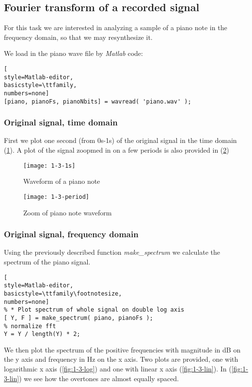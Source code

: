 \subsection{ Fourier transform of a recorded signal }
For this task we are interested in analyzing a sample of a piano note in the
frequency domain, so that we may resynthesize it.

We load in the piano wave file by \emph{Matlab} code:
\begin{lstlisting}[
style=Matlab-editor,
basicstyle=\ttfamily,
numbers=none]
[piano, pianoFs, pianoNbits] = wavread( 'piano.wav' );
\end{lstlisting}


\subsubsection{ Original signal, time domain }
First we plot one second (from 0s-1s) of the original signal in the time domain
(\ref{fig:1-3-1s}).
A plot of the signal zoopmed in on a few periods is also provided in
(\ref{fig:1-3-period})

\begin{figure}
	\center
	\texttt{[image: 1-3-1s]}
	\caption{ Waveform of a piano note }
	\label{fig:1-3-1s}
\end{figure}

\begin{figure}
	\center
	\texttt{[image: 1-3-period]}
	\caption{ Zoom of piano note waveform }
	\label{fig:1-3-period}
\end{figure}

\subsubsection{ Original signal, frequency domain }
Using the previously described function \emph{make\_spectrum} we calculate the
spectrum of the piano signal.
\begin{lstlisting}[
style=Matlab-editor,
basicstyle=\ttfamily\footnotesize,
numbers=none]
% * Plot spectrum of whole signal on double log axis
[ Y, F ] = make_spectrum( piano, pianoFs );
% normalize fft
Y = Y / length(Y) * 2;
\end{lstlisting}

We then plot the spectrum of the positive
frequencies with magnitude in dB on the y axis and frequency in Hz on the x axis. Two plots are provided, one with
logarithmic x axis (\ref{fig:1-3-log}) and one with linear x axis
(\ref{fig:1-3-lin}). In (\ref{fig:1-3-lin}) we see how the overtones are almost
equally spaced.

